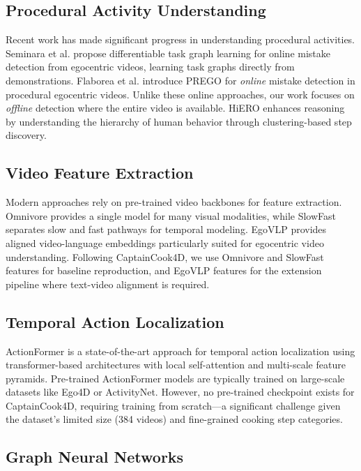 \documentclass[10pt,twocolumn,letterpaper]{article}
\begin{document}
\subsection{Procedural Activity Understanding}

Recent work has made significant progress in understanding procedural activities. Seminara et al. \cite{seminara2024dtgl} propose differentiable task graph learning for online mistake detection from egocentric videos, learning task graphs directly from demonstrations. Flaborea et al. \cite{flaborea2024prego} introduce PREGO for \textit{online} mistake detection in procedural egocentric videos. Unlike these online approaches, our work focuses on \textit{offline} detection where the entire video is available. HiERO \cite{peirone2024hiero} enhances reasoning by understanding the hierarchy of human behavior through clustering-based step discovery.

\subsection{Video Feature Extraction}

Modern approaches rely on pre-trained video backbones for feature extraction. Omnivore \cite{girdhar2022omnivore} provides a single model for many visual modalities, while SlowFast \cite{feichtenhofer2019slowfast} separates slow and fast pathways for temporal modeling. EgoVLP \cite{lin2022egocentric} provides aligned video-language embeddings particularly suited for egocentric video understanding. Following CaptainCook4D, we use Omnivore and SlowFast features for baseline reproduction, and EgoVLP features for the extension pipeline where text-video alignment is required.

\subsection{Temporal Action Localization}

ActionFormer \cite{zhang2022actionformer} is a state-of-the-art approach for temporal action localization using transformer-based architectures with local self-attention and multi-scale feature pyramids. Pre-trained ActionFormer models are typically trained on large-scale datasets like Ego4D or ActivityNet. However, no pre-trained checkpoint exists for CaptainCook4D, requiring training from scratch---a significant challenge given the dataset's limited size (384 videos) and fine-grained cooking step categories.

\subsection{Graph Neural Networks}
\end{document}
